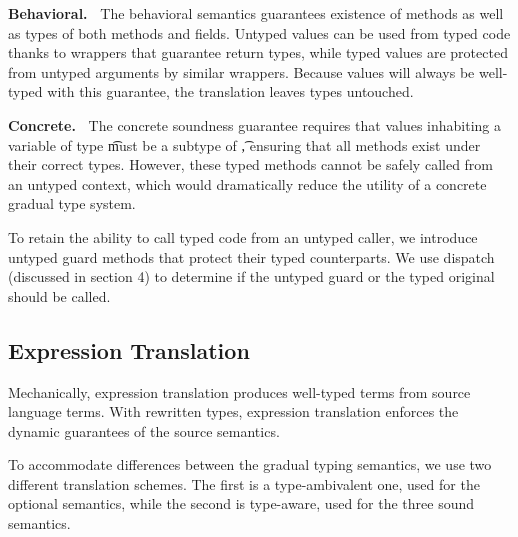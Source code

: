 \documentclass[a4paper,USenglish]{tex/lipics-v2016}
\begin{document}
{\bf Behavioral.~} The behavioral semantics guarantees existence of methods as
well as types of both methods and fields. Untyped values can be used from
typed code thanks to wrappers that guarantee return types, while typed values
are protected from untyped arguments by similar wrappers. Because values will
always be well-typed with this guarantee, the translation leaves types
untouched.

{\bf Concrete.~} The concrete soundness guarantee requires that values
inhabiting a variable of type \t must be a subtype of \t, ensuring that all
methods exist under their correct types. However, these typed methods cannot
be safely called from an untyped context, which would dramatically reduce the
utility of a concrete gradual type system.

To retain the ability to call typed code from an untyped caller, we introduce
untyped guard methods that protect their typed counterparts. We use dispatch
(discussed in section 4) to determine if the untyped guard or the typed
original should be called.

\subsection{Expression Translation} Mechanically, expression translation
produces well-typed \kafka terms from source language terms. With rewritten
types, expression translation enforces the dynamic guarantees of the source
semantics.

To accommodate differences between the gradual typing semantics, we use  two
different translation schemes. The first is a type-ambivalent one, used for
the optional semantics, while the second is type-aware, used for the three
sound semantics.
\end{document}
